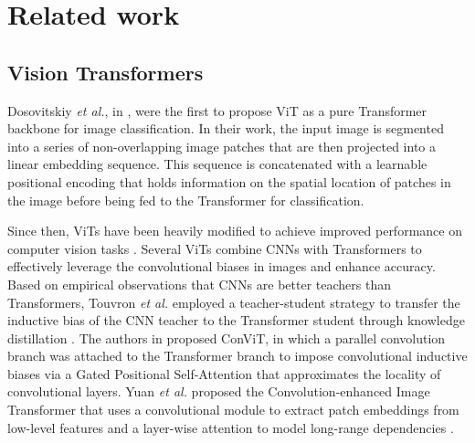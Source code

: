 \documentclass[10pt,twocolumn,letterpaper]{article}
\begin{document}
\section{Related work}
\label{sec:rwork}

\subsection{Vision Transformers}

Dosovitskiy \emph{et al.}, in \cite{Author3}, were the first to propose ViT as a pure Transformer backbone for image classification. In their work, the input image is segmented into a series of non-overlapping image patches that are then projected into a linear embedding sequence. This sequence is concatenated with a learnable positional encoding that holds information on the spatial location of patches in the image before being fed to the Transformer for classification.

Since then, ViTs have been heavily modified to achieve improved performance on computer vision tasks \cite{Author16}. Several ViTs combine CNNs with Transformers to effectively leverage the convolutional biases in images and enhance accuracy. Based on empirical observations that CNNs are better teachers than Transformers, Touvron \emph{et al.} employed a teacher-student strategy to transfer the inductive bias of the CNN teacher to the Transformer student through knowledge distillation \cite{Author4}. The authors in \cite{Author5} proposed ConViT, in which a parallel convolution branch was attached to the Transformer branch to impose convolutional inductive biases via a Gated Positional Self-Attention that approximates the locality of convolutional layers. Yuan \emph{et al.} proposed the Convolution-enhanced Image Transformer that uses a convolutional module to extract patch embeddings from low-level features and a layer-wise attention to model long-range dependencies \cite{Author6}.
\end{document}
